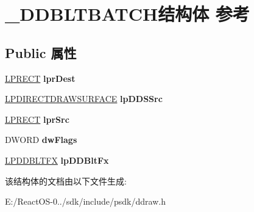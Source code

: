 \hypertarget{struct___d_d_b_l_t_b_a_t_c_h}{}\section{\+\_\+\+D\+D\+B\+L\+T\+B\+A\+T\+C\+H结构体 参考}
\label{struct___d_d_b_l_t_b_a_t_c_h}
\subsection*{Public 属性}
\begin{DoxyCompactItemize}
\item 
\mbox{\label{struct___d_d_b_l_t_b_a_t_c_h_a5e0ab5a50f9da1b16358c74a5e3417e5}} 
\hyperlink{structtag_r_e_c_t}{L\+P\+R\+E\+CT} {\bfseries lpr\+Dest}
\item 
\mbox{\label{struct___d_d_b_l_t_b_a_t_c_h_ac2c7ee4b0ad676056fac82cb28e42279}} 
\hyperlink{interfacevoid}{L\+P\+D\+I\+R\+E\+C\+T\+D\+R\+A\+W\+S\+U\+R\+F\+A\+CE} {\bfseries lp\+D\+D\+S\+Src}
\item 
\mbox{\label{struct___d_d_b_l_t_b_a_t_c_h_aaf6e48f48d2285ab76239693b06d316b}} 
\hyperlink{structtag_r_e_c_t}{L\+P\+R\+E\+CT} {\bfseries lpr\+Src}
\item 
\mbox{\label{struct___d_d_b_l_t_b_a_t_c_h_a0e4164878c4a52906735e0818c25577b}} 
D\+W\+O\+RD {\bfseries dw\+Flags}
\item 
\mbox{\label{struct___d_d_b_l_t_b_a_t_c_h_a1dda97e5675257a050b0d9d63d55a0a7}} 
\hyperlink{struct___d_d_b_l_t_f_x}{L\+P\+D\+D\+B\+L\+T\+FX} {\bfseries lp\+D\+D\+Blt\+Fx}
\end{DoxyCompactItemize}


该结构体的文档由以下文件生成\+:\begin{DoxyCompactItemize}
\item 
E\+:/\+React\+O\+S-\/0../sdk/include/psdk/ddraw.\+h\end{DoxyCompactItemize}
